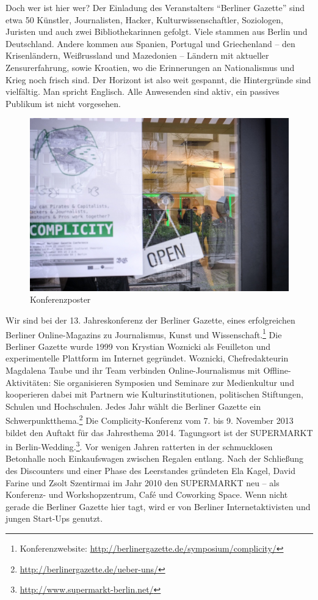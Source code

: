 \documentclass[a4paper,
fontsize=11pt,
oneside,
numbers=noperiodatend,
parskip=half-,
bibliography=totoc,
final
]{scrartcl}
\begin{document}
Doch wer ist hier wer? Der Einladung des Veranstalters \enquote{Berliner
Gazette} sind etwa 50 Künstler, Journalisten, Hacker,
Kulturwissenschaftler, Soziologen, Juristen und auch zwei
Bibliothekarinnen gefolgt. Viele stammen aus Berlin und Deutschland.
Andere kommen aus Spanien, Portugal und Griechenland -- den
Krisenländern, Weißrussland und Mazedonien -- Ländern mit aktueller
Zensurerfahrung, sowie Kroatien, wo die Erinnerungen an Nationalismus
und Krieg noch frisch sind. Der Horizont ist also weit gespannt, die
Hintergründe sind vielfältig. Man spricht Englisch. Alle Anwesenden sind
aktiv, ein passives Publikum ist nicht vorgesehen.

\begin{figure}[htbp]
\centering
\includegraphics{./img/Konferenzposter.jpg}
\caption{Konferenzposter}
\end{figure}

Wir sind bei der 13. Jahreskonferenz der Berliner Gazette, eines
erfolgreichen Berliner Online-Magazins zu Journalismus, Kunst und
Wissenschaft.\footnote{Konferenzwebsite:
  \url{http://berlinergazette.de/symposium/complicity/}} Die Berliner
Gazette wurde 1999 von Krystian Woznicki als Feuilleton und
experimentelle Plattform im Internet gegründet. Woznicki,
Chefredakteurin Magdalena Taube und ihr Team verbinden
Online-Journalismus mit Offline-Aktivitäten: Sie organisieren Symposien
und Seminare zur Medienkultur und kooperieren dabei mit Partnern wie
Kulturinstitutionen, politischen Stiftungen, Schulen und Hochschulen.
Jedes Jahr wählt die Berliner Gazette ein Schwerpunktthema.\footnote{\url{http://berlinergazette.de/ueber-uns/}}
Die Complicity-Konferenz vom 7. bis 9. November 2013 bildet den Auftakt
für das Jahresthema 2014. Tagungsort ist der SUPERMARKT in
Berlin-Wedding.\footnote{\url{http://www.supermarkt-berlin.net/}}. Vor
wenigen Jahren ratterten in der schmucklosen Betonhalle noch
Einkaufswagen zwischen Regalen entlang. Nach der Schließung des
Discounters und einer Phase des Leerstandes gründeten Ela Kagel, David
Farine und Zsolt Szentirmai im Jahr 2010 den SUPERMARKT neu -- als
Konferenz- und Workshopzentrum, Café und Coworking Space. Wenn nicht
gerade die Berliner Gazette hier tagt, wird er von Berliner
Internetaktivisten und jungen Start-Ups genutzt.
\end{document}
